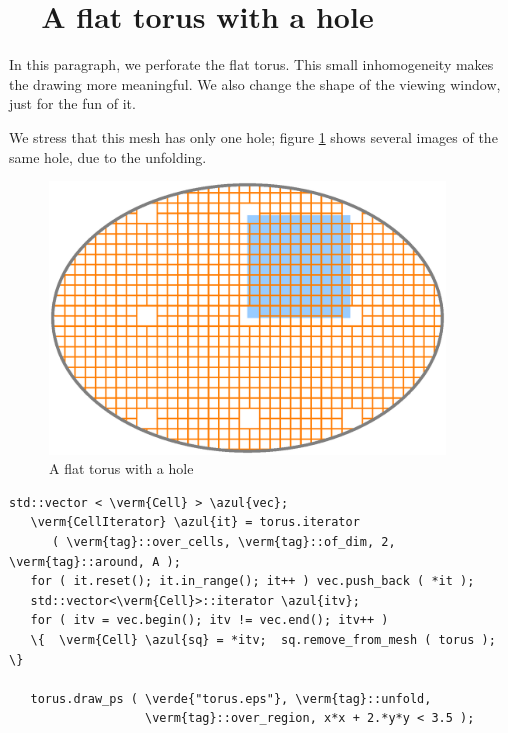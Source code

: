 \section{~~A flat torus with a hole}\label{\numb section 7.\numb parag 6}

In this paragraph, we perforate the flat torus.
This small inhomogeneity makes the drawing more meaningful.
We also change the shape of the viewing window, just for the fun of it.

We stress that this mesh has only one hole; figure \ref{\numb section 7.\numb fig 2}
shows several images of the same hole, due to the unfolding.

\begin{figure}[ht] \centering
  \includegraphics[width=105mm]{flat-torus-2.eps}
  \caption{A flat torus with a hole}
  \label{\numb section 7.\numb fig 2}
\end{figure}

\begin{Verbatim}[commandchars=\\\{\},formatcom=\small\tt,frame=single,
   label=parag-\ref{\numb section 7.\numb parag 6}.cpp,rulecolor=\color{coment},
   baselinestretch=0.94,framesep=2mm                                            ]
   std::vector < \verm{Cell} > \azul{vec};
   \verm{CellIterator} \azul{it} = torus.iterator
      ( \verm{tag}::over_cells, \verm{tag}::of_dim, 2, \verm{tag}::around, A );
   for ( it.reset(); it.in_range(); it++ ) vec.push_back ( *it );
   std::vector<\verm{Cell}>::iterator \azul{itv};
   for ( itv = vec.begin(); itv != vec.end(); itv++ )
   \{  \verm{Cell} \azul{sq} = *itv;  sq.remove_from_mesh ( torus );  \}

   torus.draw_ps ( \verde{"torus.eps"}, \verm{tag}::unfold,
                   \verm{tag}::over_region, x*x + 2.*y*y < 3.5 );
\end{Verbatim}

